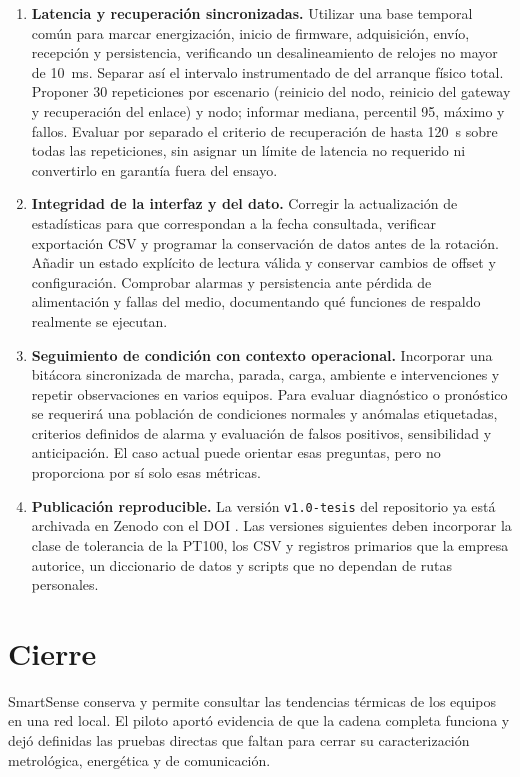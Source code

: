 \begin{enumerate}
\item \textbf{Latencia y recuperación sincronizadas.} Utilizar una base temporal común para marcar energización, inicio de firmware, adquisición, envío, recepción y persistencia, verificando un desalineamiento de relojes no mayor de 10~ms. Separar así el intervalo instrumentado de \TiempoActivo{} del arranque físico total. Proponer 30 repeticiones por escenario (reinicio del nodo, reinicio del gateway y recuperación del enlace) y nodo; informar mediana, percentil 95, máximo y fallos. Evaluar por separado el criterio de recuperación de hasta 120~s sobre todas las repeticiones, sin asignar un límite de latencia no requerido ni convertirlo en garantía fuera del ensayo.

\item \textbf{Integridad de la interfaz y del dato.} Corregir la actualización de estadísticas para que correspondan a la fecha consultada, verificar exportación CSV y programar la conservación de datos antes de la rotación. Añadir un estado explícito de lectura válida y conservar cambios de offset y configuración. Comprobar alarmas y persistencia ante pérdida de alimentación y fallas del medio, documentando qué funciones de respaldo realmente se ejecutan.

\item \textbf{Seguimiento de condición con contexto operacional.} Incorporar una bitácora sincronizada de marcha, parada, carga, ambiente e intervenciones y repetir observaciones en varios equipos. Para evaluar diagnóstico o pronóstico se requerirá una población de condiciones normales y anómalas etiquetadas, criterios definidos de alarma y evaluación de falsos positivos, sensibilidad y anticipación. El caso actual puede orientar esas preguntas, pero no proporciona por sí solo esas métricas.

\item \textbf{Publicación reproducible.} La versión \texttt{v1.0-tesis} del repositorio ya está archivada en Zenodo con el DOI \DOIZenodo{}. Las versiones siguientes deben incorporar la clase de tolerancia de la PT100, los CSV y registros primarios que la empresa autorice, un diccionario de datos y scripts que no dependan de rutas personales.
\end{enumerate}

\section{Cierre}
SmartSense conserva y permite consultar las tendencias térmicas de los equipos en una red local. El piloto aportó evidencia de que la cadena completa funciona y dejó definidas las pruebas directas que faltan para cerrar su caracterización metrológica, energética y de comunicación.
